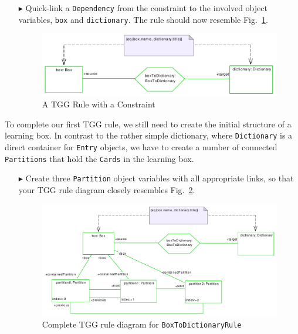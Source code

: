\begin{enumerate}
  \item[$\blacktriangleright$] Quick-link a \texttt{Dependency} from the
  constraint to the involved object variables, \texttt{box} and \texttt{dictionary}.
  The rule should now resemble Fig.~\ref{fig:tgg_rule_with_constraint}.

  \begin{figure}[htbp]
  \begin{center}
    \includegraphics[width=\textwidth]{pics/tggBilder/tggRule/tgg14}
    \caption{A TGG Rule with a Constraint}
    \label{fig:tgg_rule_with_constraint}
    \end{center}
  \end{figure}

\end{enumerate}

To complete our first TGG rule, we still need to create the initial structure of a learning box.
In contrast to the rather simple dictionary, where \texttt{Dictionary} is a direct container for \texttt{Entry} objects, we have to create a number of connected \texttt{Partitions} that hold the \texttt{Cards} in the learning box.

\begin{enumerate}
  \item[$\blacktriangleright$] Create three \texttt{Partition} object variables with all appropriate links, so that your TGG rule diagram closely resembles Fig.~\ref{fig:boxtodictionaryrule_complete}.

  \begin{figure}[htbp]
  \begin{center}
    \includegraphics[width=\textwidth]{pics/tggBilder/tggRule/tgg15}
    \caption{Complete TGG rule diagram for \texttt{BoxToDictionaryRule}}
    \label{fig:boxtodictionaryrule_complete}
  \end{center}
  \end{figure}

\end{enumerate}

